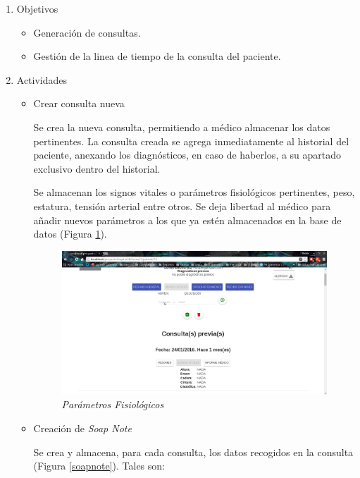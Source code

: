     \begin{enumerate}
        \item Objetivos
        \begin{itemize}
            \item Generación de consultas.
            \item Gestión de la linea de tiempo de la consulta del paciente.
        \end{itemize}
        \item Actividades
        \begin{itemize}
            \item Crear consulta nueva
            
            Se crea la nueva consulta, permitiendo a médico almacenar los datos pertinentes. La consulta creada se agrega inmediatamente al historial del paciente, anexando los diagnósticos, en caso de haberlos, a su apartado exclusivo dentro del historial.
            
            Se almacenan los signos vitales o parámetros fisiológicos pertinentes, peso, estatura, tensión arterial entre otros. Se deja libertad al médico para añadir nuevos parámetros a los que ya estén almacenados en la base de datos (Figura \ref{parametros}).
            
            \begin{figure}[htbp!]
                \begin{center}
                    \includegraphics[width=.8\textwidth]{figures/p13}
                \end{center}
                \caption{\textit{Parámetros Fisiológicos}}
                \label{parametros}
            \end{figure}
            
            \item Creación de \textit{Soap Note}
            
            Se crea y almacena, para cada consulta, los datos recogidos en la consulta (Figura \ref{soapnote}). Tales son:
            

\end{itemize}
\end{enumerate}
